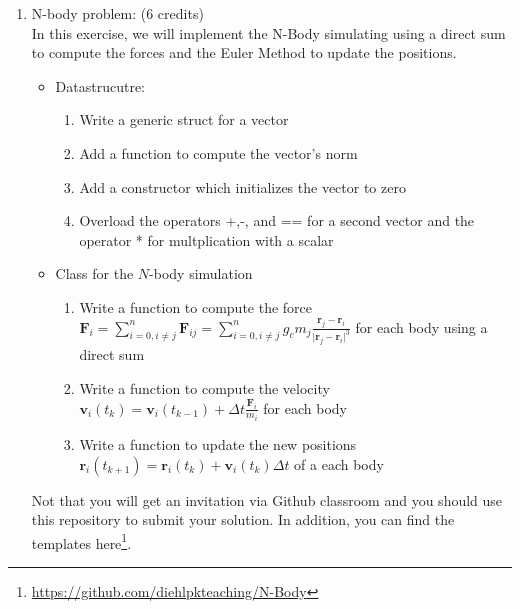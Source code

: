 \documentclass[11pt]{article}
\begin{document}
\begin{enumerate}

\item N-body problem: (6 credits)\\
In this exercise, we will implement the N-Body simulating using a direct sum to compute the forces and the Euler Method to update the positions.
\begin{itemize}
\item Datastrucutre:
\begin{enumerate}
\item Write a generic struct for a vector
\item Add a function to compute the vector's norm
\item Add a constructor which initializes the vector to zero
\item Overload the operators +,-, and == for a second vector and the operator * for multplication with a scalar
\end{enumerate}
\item Class for the $N$-body simulation
\begin{enumerate}
\item Write a function to compute the force $\mathbf{F}_i=\sum\limits_{i=0,i\neq j}^n \mathbf{F}_{ij}= \sum\limits_{i=0,i\neq j}^n g_c m_j \frac{\mathbf{r}_j-\mathbf{r}_i}{\vert \mathbf{r}_j - \mathbf{r}_i\vert^3}$ for each body using a direct sum
\item Write a function to compute the velocity $\mathbf{v}_i(t_k)=\mathbf{v}_i(t_{k-1})+\Delta t \frac{\mathbf{F}_i}{m_i}$ for each body
\item Write a function to update the new positions $\mathbf{r}_i(t_{k+1})=\mathbf{r}_i(t_k)+\mathbf{v}_i(t_k)\Delta t$ of a each body
\end{enumerate}
\end{itemize}



Not that you will get an invitation via Github classroom and you should use this repository to submit your solution. In addition, you can find the templates here\footnote{\url{https://github.com/diehlpkteaching/N-Body}}.



\end{enumerate}

\doclicenseThis 
\end{document}
